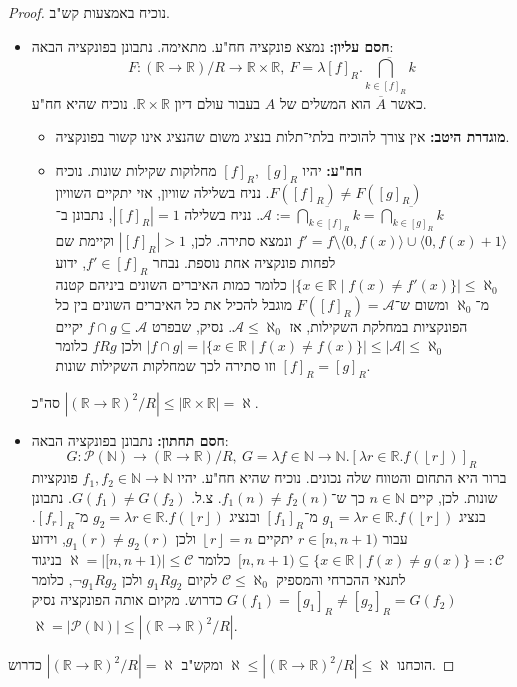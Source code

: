 \documentclass[]{article}
\newcommand\N     {\mathbb{N}}
\newcommand\R     {\mathbb{R}}
\newcommand\ps    {\mathcal{P}}
\newcommand\ac    {\mathcal{A}}
\newcommand\cc    {\mathcal{C}}
\newcommand\ra    {\rangle}
\newcommand\la    {\langle}
\newcommand\rf    {\right\rfloor}
\newcommand\lf    {\left\lfloor}
\newcommand\az    {\aleph_0}
\newcommand\al    {\aleph}
\begin{document}
\begin{enumerate}[(a)]
		\begin{proof}
			נוכיח באמצעות קש"ב. 
			\begin{itemize}
				\item \textbf{חסם עליון: }נמצא פונקציה חח"ע. מתאימה. נתבונן בפונקציה הבאה: 
				\[ F \colon (\R \to \R)/R \to \R \times \R, \  F = \lambda [f]_R. \overline{\bigcap_{k \in [f]_R} k} \]
				כאשר $\overline A$ הוא המשלים של $A$ בעבור עולם דיון $\R \times \R$. נוכיח שהיא חח"ע. 
				\begin{itemize}
					\item \textbf{מוגדרת היטב: }אין צורך להוכיח בלתי־תלות בנציג משום שהנציג אינו קשור בפונקציה. 
					\item \textbf{חח"ע: }יהיו $[f]_R, \ [g]_R$ מחלוקות שקילות שונות. נוכיח $F([f]_R) \neq F([g]_R)$. נניח בשלילה שוויון, אזי יתקיים השוויון $\ac :=  \overline {\bigcap_{k \in [f]_R} k} = \overline{\bigcap_{k \in [g]_R} k} $. נניח בשלילה $|[f]_R| = 1$, נתבונן ב־$f' = f \setminus \la 0, f(x) \ra \cup \la 0, f(x) + 1 \ra$ ונמצא סתירה. לכן, $|[f]_R| > 1$ וקיימת שם לפחות פונקציה אחת נוספת. נבחר $f' \in [f]_R$, ידוע $|\{x \in \R \mid f(x) \neq f'(x)\}| \le \az$ כלומר כמות האיברים השונים ביניהם קטנה מ־$\az$ ומשום ש־$F([f]_R) = \ac$ מוגבל להכיל את כל האיברים השונים בין כל הפונקציות במחלקת השקילות, אז $\ac  \le \az$. נסיק, שבפרט $f \cap g \subseteq \ac$ יקיים $|f \cap g| = |\{x \in \R \mid f(x) \neq f(x)\}| \le |\ac| \le \az$ ולכן $fRg$ כלומר $[f]_R = [g]_R$ וזו סתירה לכך שמחלקות השקילות שונות. 
				\end{itemize}
				סה"כ $|(\R \to \R)^2 / R| \le |\R \times \R| = \al$. 
				\item \textbf{חסם תחתון: }נתבונן בפונקציה הבאה: 
				\[ G \colon \ps(\N) \to (\R \to \R) / R, \ G = \lambda f \in \N \to \N. [\lambda r \in \R. f(\lf r \rf)]_R \]
				ברור היא התחום והטווח שלה נכונים. נוכיח שהיא חח"ע. יהיו $f_1, f_2 \in \N \to \N$ פונקציות שונות. לכן, קיים $n \in \N$ כך ש־$f_1(n) \neq f_2(n)$. צ.ל. $G(f_1) \neq G(f_2)$. נתבונן בנציג $g_1=  \lambda r \in \R. f(\lf r \rf)$ מ־$[f_1]_R$ ובנציג $g_2 = \lambda r \in \R. f(\lf r \rf)$ מ־$[f_r]_R$. עבור $r \in [n, n + 1)$ יתקיים $\lf r \rf = n$ ולכן $g_1(r) \neq g_2(r)$, וידוע $\ [n, n + 1) \subseteq \{x \in \R \mid f(x) \neq g(x)\} =: \cc$ כלומר $\al = |[n, n + 1)| \le \cc$ בניגוד לתנאי ההכרחי והמספיק $\cc \le \az$ לקיום $g_1Rg_2$ ולכן $\lnot g_1 R g_2$, כלומר $G(f_1) = [g_1]_R \neq [g_2]_R = G(f_2)$ כדרוש. מקיום אותה הפונקציה נסיק $\al = |\ps(\N)| \le |(\R\to \R)^2/R|$. 
			\end{itemize}
			הוכחנו $\al \le |(\R \to \R)^2 / R| \le \al$ ומקש"ב $|(\R \to \R)^2 / R| = \al$ כדרוש. 
		\end{proof}
		
	\end{enumerate}
	
\end{document}
